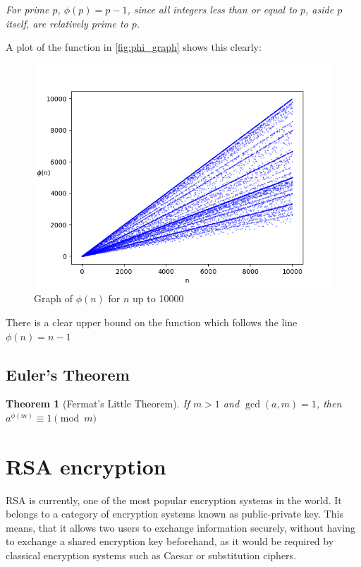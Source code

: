 \documentclass[12pt, titlepage]{article}
\newtheorem{theorem}{Theorem}
\let\oldsection\section
\renewcommand\section{\clearpage\oldsection}
\begin{document}
\textit{For prime $p$, $\phi(p) = p - 1$, since all integers less than or equal to $p$,
aside $p$ itself, are relatively prime to $p$.} 

A plot of the function in \autoref{fig:phi_graph} shows this clearly:
%
\begin{figure}[H]
    \centering
    \includegraphics[width=\textwidth]{phi_10000}
    \caption{Graph of $\phi(n)$ for $n$ up to 10000}
    \label{fig:phi_graph}
\end{figure}
%
There is a clear upper bound on the function which follows the line $\phi(n) = n-1$

\subsection{Euler's Theorem}

\begin{theorem}[Fermat's Little Theorem]
    If $m>1$ and $\gcd(a, m) = 1$, then $a^{\phi(m)} \equiv 1 \pmod m$
\end{theorem}

\section{RSA encryption}

RSA \autocite{rsa} is currently, one of the most popular encryption systems in the world.
It belongs to a category of encryption systems known as public-private key.  This means,
that it allows two users to exchange information securely, without having to exchange a
shared encryption key beforehand, as it would be required by classical encryption systems
such as Caesar or substitution ciphers. 
\end{document}
